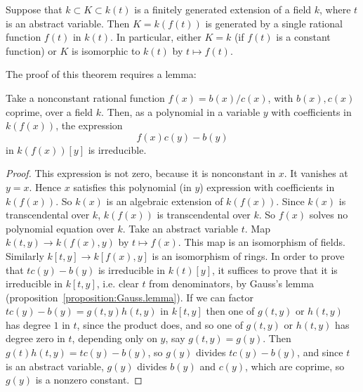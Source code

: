 \begin{theorem}
Suppose that \(k \subset K \subset k(t)\) is a finitely generated extension of a field \(k\), where \(t\) is an abstract variable.
Then \(K=k(f(t))\) is generated by a single rational function \(f(t)\) in \(k(t)\).
In particular, either \(K=k\) (if \(f(t)\) is a constant function) or \(K\) is isomorphic to \(k(t)\) by \(t \mapsto f(t)\).
\end{theorem}
The proof of this theorem requires a lemma:
\begin{lemma}
Take a nonconstant rational function \(f(x)=b(x)/c(x)\), with \(b(x), c(x)\) coprime, over a field \(k\).
Then, as a polynomial in a variable \(y\) with coefficients in \(k(f(x))\), the expression
\[
f(x)c(y)-b(y) 
\]
in \(k(f(x))[y]\) is irreducible.
\end{lemma}
\begin{proof}
This expression is not zero, because it is nonconstant in \(x\).
It vanishes at \(y=x\).
Hence \(x\) satisfies this polynomial (in \(y\)) expression with coefficients in \(k(f(x))\).
So \(k(x)\) is an algebraic extension of \(k(f(x))\).
Since \(k(x)\) is transcendental over \(k\), \(k(f(x))\) is transcendental over \(k\).
So \(f(x)\) solves no polynomial equation over \(k\).
Take an abstract variable \(t\). 
Map \(k(t,y) \to k(f(x),y)\) by \(t \mapsto f(x)\).
This map is an isomorphism of fields.
Similarly \(k[t,y] \to k[f(x),y]\) is an isomorphism of rings.
In order to prove that \(tc(y)-b(y)\) is irreducible in \(k(t)[y]\), it suffices to prove that it is irreducible in \(k[t,y]\), i.e. clear \(t\) from denominators, by Gauss's lemma (proposition~\vref{proposition:Gauss.lemma}).
If we can factor \(tc(y)-b(y)=g(t,y)h(t,y)\) in \(k[t,y]\) then one of \(g(t,y)\) or \(h(t,y)\) has degree \(1\) in \(t\), since the product does, and so one of \(g(t,y)\) or \(h(t,y)\) has degree zero in \(t\), depending only on \(y\), say \(g(t,y)=g(y)\).
Then \(g(t)h(t,y)=tc(y)-b(y)\), so \(g(y)\) divides \(tc(y)-b(y)\), and since \(t\) is an abstract variable, \(g(y)\) divides \(b(y)\) and \(c(y)\), which are coprime, so \(g(y)\) is a nonzero constant.
\end{proof}

